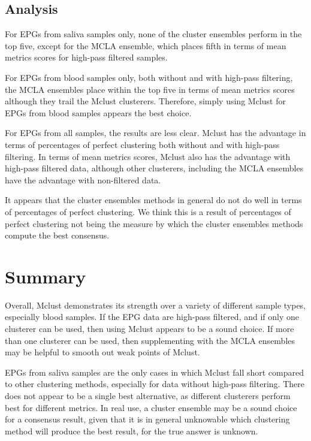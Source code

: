 \subsection{Analysis}

For EPGs from saliva samples only, none of the cluster ensembles perform in the top five, except for the MCLA ensemble, which places fifth in terms of mean metrics scores for high-pass filtered samples.

For EPGs from blood samples only, both without and with high-pass filtering, the MCLA ensembles place within the top five in terms of mean metrics scores although they trail the Mclust clusterers. Therefore, simply using Mclust for EPGs from blood samples appears the best choice.

For EPGs from all samples, the results are less clear. Mclust has the advantage in terms of percentages of perfect clustering both without and with high-pass filtering. In terms of mean metrics scores, Mclust also has the advantage with high-pass filtered data, although other clusterers, including the MCLA ensembles have the advantage with non-filtered data.

It appears that the cluster ensembles methods in general do not do well in terms of percentages of perfect clustering. We think this is a result of percentages of perfect clustering not being the measure by which the cluster ensembles methods compute the best consensus.

\section{Summary}

Overall, Mclust demonstrates its strength over a variety of different sample types, especially blood samples. If the EPG data are high-pass filtered, and if only one clusterer can be used, then using Mclust appears to be a sound choice. If more than one clusterer can be used, then supplementing with the MCLA ensembles may be helpful to smooth out weak points of Mclust.

EPGs from saliva samples are the only cases in which Mclust fall short compared to other clustering methods, especially for data without high-pass filtering. There does not appear to be a single best alternative, as different clusterers perform best for different metrics. In real use, a cluster ensemble may be a sound choice for a consensus result, given that it is in general unknowable which clustering method will produce the best result, for the true answer is unknown.
